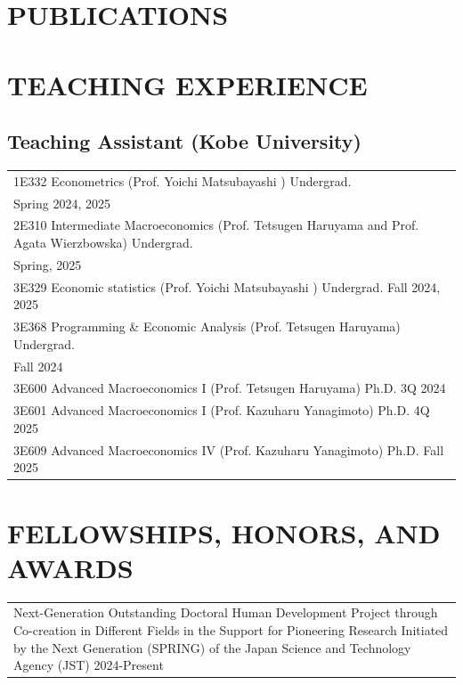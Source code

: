 \documentclass[11pt]{article}
\begin{document}
\section*{PUBLICATIONS}

\section*{TEACHING EXPERIENCE}
\subsection*{Teaching Assistant (Kobe University)}
\begin{tabularx}{\linewidth}{X}
1E332 Econometrics (Prof.  Yoichi Matsubayashi ) Undergrad. \\
\hfill Spring 2024, 2025\\
2E310 Intermediate Macroeconomics (Prof. Tetsugen Haruyama and Prof. Agata Wierzbowska) Undergrad. \\ \hfill Spring, 2025\\
3E329 Economic statistics (Prof.  Yoichi Matsubayashi ) Undergrad. \hfill Fall 2024, 2025\\
3E368 Programming \& Economic Analysis (Prof. Tetsugen Haruyama) Undergrad. \\
\hfill Fall 2024 \\
3E600 Advanced Macroeconomics I (Prof. Tetsugen Haruyama) Ph.D. \hfill 3Q 2024\\
3E601 Advanced Macroeconomics I (Prof. Kazuharu Yanagimoto) Ph.D. \hfill 4Q 2025\\
3E609 Advanced Macroeconomics IV (Prof. Kazuharu Yanagimoto) Ph.D. \hfill Fall 2025\\
\end{tabularx}

\section*{FELLOWSHIPS, HONORS, AND AWARDS}
\begin{tabularx}{\linewidth}{X}
Next-Generation Outstanding Doctoral Human Development Project through Co-creation in Different Fields in the Support for Pioneering Research Initiated by the Next Generation (SPRING) of the Japan Science and Technology Agency (JST) \hfill 2024-Present
\end{tabularx}
\end{document}
